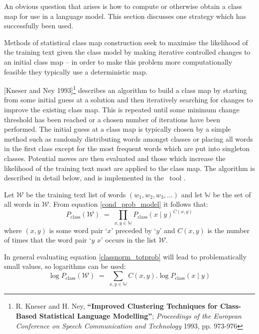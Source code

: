 \label{clustering_section}
An obvious question that arises is how to compute or otherwise obtain
a class map for use in a language model. This section discusses
one strategy which has successfully been used.

Methods of statistical class map construction seek to maximise the
likelihood of the training text given the class model by making
iterative controlled changes to an initial class map -- in order to
make this problem more computationally feasible they typically use a
deterministic map.

\label{KN-clustering}
[Kneser and Ney 1993]\footnote{R. Kneser and H. Ney,
\textbf{``Improved Clustering Techniques for Class-Based Statistical Language
Modelling''}; \textit{Proceedings of the European Conference on Speech
Communication and Technology} 1993, pp. 973-976} describes an
algorithm to build a class map by starting from some initial guess at
a solution and then iteratively searching for changes to improve the
existing class map.  This is repeated until some minimum change
threshold has been reached or a chosen number of iterations have been
performed. The initial guess at a class map is typically chosen by a
simple method such as randomly distributing words amongst classes or
placing all words in the first class except for the most frequent
words which are put into singleton classes. Potential moves are then
evaluated and those which increase the likelihood of the training text
most are applied to the class map. The algorithm is described in
detail below, and is implemented in the \HTK\ tool .

Let $\mathcal{W}$ be the training text list of words $(w_1, w_2, w_3,
\ldots)$ and let $\mathbb{W}$ be the set of all words in
$\mathcal{W}$.
From equation
\ref{cond_prob_model} it follows that:
\begin{equation}
P_\mathrm{class}(\mathcal{W}) \;=\; \prod_{x, y \in \mathbb{W}}
P_\mathrm{class}(x \;|\; y)^{C(x,y)}\label{classnorm_totprob}
\end{equation}
where $(x, y)$ is some word pair `$x$' preceded by `$y$' and $C(x, y)$
is the number of times that the word pair `$y$ $x$' occurs in the list
$\mathcal{W}$.

In general evaluating equation \ref{classnorm_totprob} will lead to
problematically small values, so logarithms can be used:
\begin{equation}
\log P_\mathrm{class}(\mathcal{W}) \;=\; \sum_{x, y \in \mathbb{W}}
C(x, y) . \log P_\mathrm{class}(x \;|\; y) \label{classnorm_logprob}
\end{equation}

